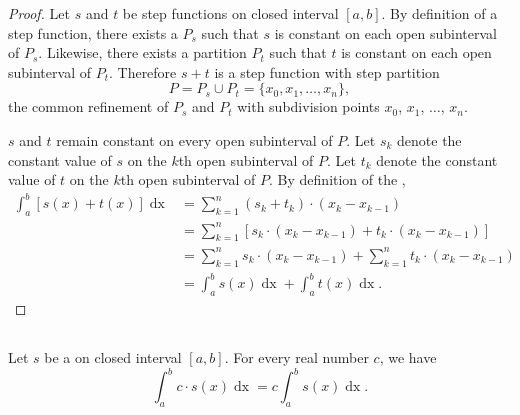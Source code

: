 \documentclass{report}
\begin{document}
  \begin{proof}
    Let $s$ and $t$ be step functions on closed interval $[a, b]$.
    By definition of a step function, there exists a 
      $P_s$ such that $s$ is constant on each open subinterval of $P_s$.
    Likewise, there exists a partition $P_t$ such that $t$ is constant on each
      open subinterval of $P_t$.
    Therefore $s + t$ is a step function with step partition
      $$P = P_s \cup P_t = \{x_0, x_1, \ldots, x_n\},$$ the common refinement of
      $P_s$ and $P_t$ with subdivision points $x_0$, $x_1$, $\ldots$, $x_n$.

    $s$ and $t$ remain constant on every open subinterval of $P$.
    Let $s_k$ denote the constant value of $s$ on the $k$th open subinterval of
      $P$.
    Let $t_k$ denote the constant value of $t$ on the $k$th open subinterval of
      $P$.
    By definition of the ,
      \begin{align*}
        \int_a^b \left[ s(x) + t(x) \right] \mathop{dx}
          & = \sum_{k=1}^n (s_k + t_k) \cdot (x_k - x_{k-1}) \\
          & = \sum_{k=1}^n \left[ s_k \cdot (x_k - x_{k-1}) +
                                  t_k \cdot (x_k - x_{k-1}) \right] \\
          & = \sum_{k=1}^n s_k \cdot (x_k - x_{k-1}) +
              \sum_{k=1}^n t_k \cdot (x_k - x_{k-1}) \\
          & = \int_a^b s(x) \mathop{dx} + \int_a^b t(x) \mathop{dx}.
      \end{align*}
  \end{proof}

\subsection{}%

  \begin{theorem}[1.3]
    Let $s$ be a  on closed interval $[a, b]$.
    For every real number $c$, we have
      $$\int_a^b c \cdot s(x) \mathop{dx} = c\int_a^b s(x) \mathop{dx}.$$
  \end{theorem}
\end{document}
